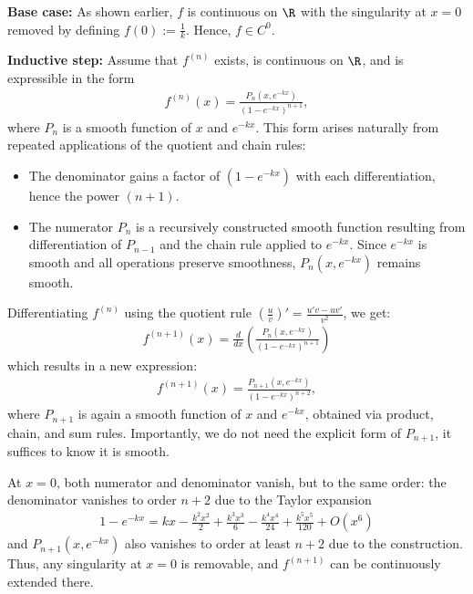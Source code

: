 \begin{Itemize}
    \Item{} \textbf{Base case:} As shown earlier, $f$ is continuous on $\R$ with the singularity at $x = 0$ removed by defining $f(0) := \frac{1}{k}$. Hence, $f \in C^0$.

    \Item{} \textbf{Inductive step:} Assume that $f^{(n)}$ exists, is continuous on $\R$, and is expressible in the form
    \begin{align}
        f^{(n)}(x) = \frac{P_n(x, e^{-kx})}{(1 - e^{-kx})^{n+1}},
    \end{align}
    where $P_n$ is a smooth function of $x$ and $e^{-kx}$. This form arises naturally from repeated applications of the quotient and chain rules:
    
    \begin{itemize}
        \item The denominator gains a factor of $(1 - e^{-kx})$ with each differentiation, hence the power $(n+1)$.
        \item The numerator $P_n$ is a recursively constructed smooth function resulting from differentiation of $P_{n-1}$ and the chain rule applied to $e^{-kx}$. Since $e^{-kx}$ is smooth and all operations preserve smoothness, $P_n(x, e^{-kx})$ remains smooth.
    \end{itemize}
    
    Differentiating $f^{(n)}$ using the quotient rule $\left(\frac{u}{v}\right)' = \frac{u' v - u v'}{v^2}$, we get:
    \begin{align}
        f^{(n+1)}(x) = \frac{d}{dx} \left( \frac{P_n(x, e^{-kx})}{(1 - e^{-kx})^{n+1}} \right)
    \end{align}
    which results in a new expression:
    \begin{align}
        f^{(n+1)}(x) = \frac{P_{n+1}(x, e^{-kx})}{(1 - e^{-kx})^{n+2}},
    \end{align}
    where $P_{n+1}$ is again a smooth function of $x$ and $e^{-kx}$, obtained via product, chain, and sum rules. Importantly, we do not need the explicit form of $P_{n+1}$, it suffices to know it is smooth.

    At $x = 0$, both numerator and denominator vanish, but to the same order: the denominator vanishes to order $n+2$ due to the Taylor expansion
    \begin{align}
        1 - e^{-kx} = kx - \frac{k^2 x^2}{2} + \frac{k^3 x^3}{6} - \frac{k^4 x^4}{24} + \frac{k^5 x^5}{120} + O(x^6)
    \end{align}
    and $P_{n+1}(x, e^{-kx})$ also vanishes to order at least $n+2$ due to the construction. Thus, any singularity at $x = 0$ is removable, and $f^{(n+1)}$ can be continuously extended there.
\end{Itemize}

